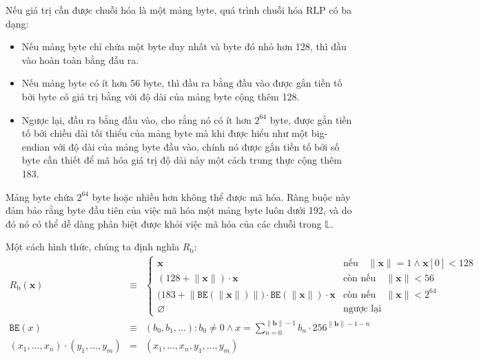 \documentclass[9pt,oneside]{amsart}
\makeatletter
\newcommand{\linkdest}[1]{\Hy@raisedlink{\hypertarget{#1}{}}}
\makeatother
\begin{document}
\hypertarget{RLP_serialisation_of_a_byte_array_R__b_word_def}{}\linkdest{R__b}Nếu giá trị cần được chuỗi hóa là một mảng byte, quá trình chuỗi hóa RLP có ba dạng:

\begin{itemize}
\item Nếu mảng byte chỉ chứa một byte duy nhất và byte đó nhỏ hơn 128, thì đầu vào hoàn toàn bằng đầu ra.
\item Nếu mảng byte có ít hơn 56 byte, thì đầu ra bằng đầu vào được gắn tiền tố bởi byte có giá trị bằng với độ dài của mảng byte cộng thêm 128.
\item Ngược lại, đầu ra bằng đầu vào, cho rằng nó có ít hơn $2^{64}$ byte, được gắn tiền tố bởi chiều dài tối thiểu của mảng byte mà khi được hiểu như một big-endian với độ dài của mảng byte đầu vào, chính nó được gắn tiền tố bởi số byte cần thiết để mã hóa giá trị độ dài này một cách trung thực cộng thêm 183.
\end{itemize}

Mảng byte chứa $2^{64}$ byte hoặc nhiều hơn không thể được mã hóa. Ràng buộc này đảm bảo rằng byte đầu tiên của việc mã hóa một mảng byte luôn dưới 192, và do đó nó có thể dễ dàng phân biệt được khỏi việc mã hóa của các chuỗi trong $\mathbb{L}$.

\hypertarget{RLP_serialisation_of_a_byte_array_R__b_math_def}{}Một cách hình thức, chúng ta định nghĩa $R_{\mathrm{b}}$:
\begin{eqnarray}
R_{\mathrm{b}}(\mathbf{x}) & \equiv & \begin{cases}
\mathbf{x} & \text{nếu} \quad \lVert \mathbf{x} \rVert = 1 \wedge \mathbf{x}[0] < 128 \\
(128 + \lVert \mathbf{x} \rVert) \cdot \mathbf{x} & \text{còn nếu} \quad \lVert \mathbf{x} \rVert < 56 \\
\big(183 + \big\lVert \mathtt{BE}(\lVert \mathbf{x} \rVert) \big\rVert \big) \cdot \mathtt{BE}(\lVert \mathbf{x} \rVert) \cdot \mathbf{x} & \text{còn nếu} \quad \lVert \mathbf{x} \rVert < 2^{64} \\
\varnothing & \text{ngược lại}
\end{cases} \\
\label{eq:BE}
\mathtt{BE}(x) & \equiv & (b_0, b_1, ...): b_0 \neq 0 \wedge x = \sum_{n = 0}^{\lVert \mathbf{b} \rVert - 1} b_n \cdot 256^{\lVert \mathbf{b} \rVert - 1 - n} \\
(x_1, ..., x_n) \cdot (y_1, ..., y_m) & = & (x_1, ..., x_n, y_1, ..., y_m)
\end{eqnarray}
\end{document}
